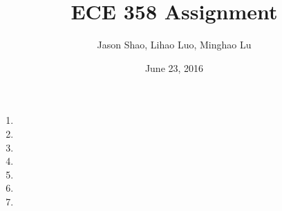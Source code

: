 \documentclass[12pt]{article}
\title{ECE 358 Assignment }
\author{Jason Shao, Lihao Luo, Minghao Lu}
\date{June 23, 2016}
\begin{document}
\maketitle
\renewcommand{\thesubsection}{Problem \arabic{subsection}}


\def\question#1{\item[\bf #1.]}
\def\part#1{\item[\bf #1)]}
\newcommand{\pc}[1]{\mbox{\textbf{#1}}} %

\begin{enumerate}
	\item %
	\item %
	\item %
	\item %
	\item %
	\item %
	\item %

\end{enumerate}
\end{document}
